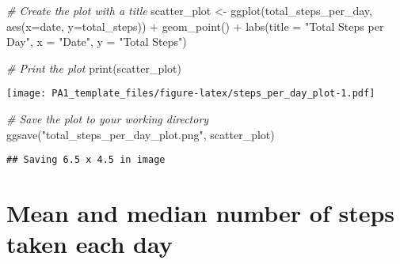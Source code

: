 \documentclass[
]{article}
\newenvironment{Shaded}{\begin{snugshade}}{\end{snugshade}}
\newcommand{\AttributeTok}[1]{\textcolor[rgb]{0.77,0.63,0.00}{#1}}
\newcommand{\CommentTok}[1]{\textcolor[rgb]{0.56,0.35,0.01}{\textit{#1}}}
\newcommand{\ConstantTok}[1]{\textcolor[rgb]{0.00,0.00,0.00}{#1}}
\newcommand{\FunctionTok}[1]{\textcolor[rgb]{0.00,0.00,0.00}{#1}}
\newcommand{\NormalTok}[1]{#1}
\newcommand{\OtherTok}[1]{\textcolor[rgb]{0.56,0.35,0.01}{#1}}
\newcommand{\SpecialCharTok}[1]{\textcolor[rgb]{0.00,0.00,0.00}{#1}}
\newcommand{\StringTok}[1]{\textcolor[rgb]{0.31,0.60,0.02}{#1}}
\begin{document}
\begin{Shaded}
\begin{Highlighting}[]
\CommentTok{\# Create the plot with a title}
\NormalTok{scatter\_plot }\OtherTok{\textless{}{-}} \FunctionTok{ggplot}\NormalTok{(total\_steps\_per\_day, }\FunctionTok{aes}\NormalTok{(}\AttributeTok{x=}\NormalTok{date, }\AttributeTok{y=}\NormalTok{total\_steps)) }\SpecialCharTok{+}
  \FunctionTok{geom\_point}\NormalTok{() }\SpecialCharTok{+}
  \FunctionTok{labs}\NormalTok{(}\AttributeTok{title =} \StringTok{"Total Steps per Day"}\NormalTok{, }\AttributeTok{x =} \StringTok{"Date"}\NormalTok{, }\AttributeTok{y =} \StringTok{"Total Steps"}\NormalTok{)}

\CommentTok{\# Print the plot}
\FunctionTok{print}\NormalTok{(scatter\_plot)}
\end{Highlighting}
\end{Shaded}

\texttt{[image: PA1\_template\_files/figure-latex/steps\_per\_day\_plot-1.pdf]}

\begin{Shaded}
\begin{Highlighting}[]
\CommentTok{\# Save the plot to your working directory}
\FunctionTok{ggsave}\NormalTok{(}\StringTok{"total\_steps\_per\_day\_plot.png"}\NormalTok{, scatter\_plot)}
\end{Highlighting}
\end{Shaded}

\begin{verbatim}
## Saving 6.5 x 4.5 in image
\end{verbatim}

\hypertarget{mean-and-median-number-of-steps-taken-each-day}{%
\section{Mean and median number of steps taken each
day}\label{mean-and-median-number-of-steps-taken-each-day}}

\begin{Shaded}
\end{Shaded}
\end{document}
